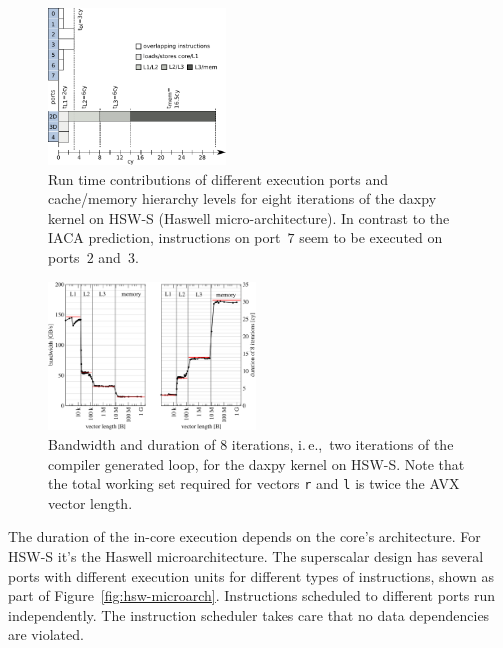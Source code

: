
\begin{figure}[tp]
  \centering
  \includegraphics[width=0.42\textwidth,clip=true]{images/ecm-hsw-daxpy}
  \caption{Run time contributions of different execution ports and cache/memory
hierarchy levels for eight iterations of the daxpy kernel on HSW-S (Haswell micro-architecture). In contrast to the IACA prediction, instructions on port~$7$
seem to be executed on ports~$2$ and~$3$.}
  \label{fig:daxpy:ecm}
\end{figure}

\begin{figure}[tp]
  \centering
  \includegraphics[width=0.49\textwidth,clip=true]{images/daxpy-bw-hasep1-f-2_3-w-cy}
  \caption{Bandwidth and duration of 8 iterations, i.\,e.,\ two iterations of the
compiler generated loop, for the daxpy kernel on HSW-S. Note that the total
working set required for vectors
\protect\texttt{r} and \texttt{l} is twice the AVX vector length.}
  \label{fig:daxpy:perf}
\end{figure}

The duration of the in-core execution depends on the core's architecture.
For HSW-S it's the Haswell microarchitecture.
The superscalar design has several ports with different execution units for
different types of instructions, shown as part of Figure~\ref{fig:hsw-microarch}. 
Instructions scheduled to different ports run independently.
The instruction scheduler takes care that no data dependencies are violated.

